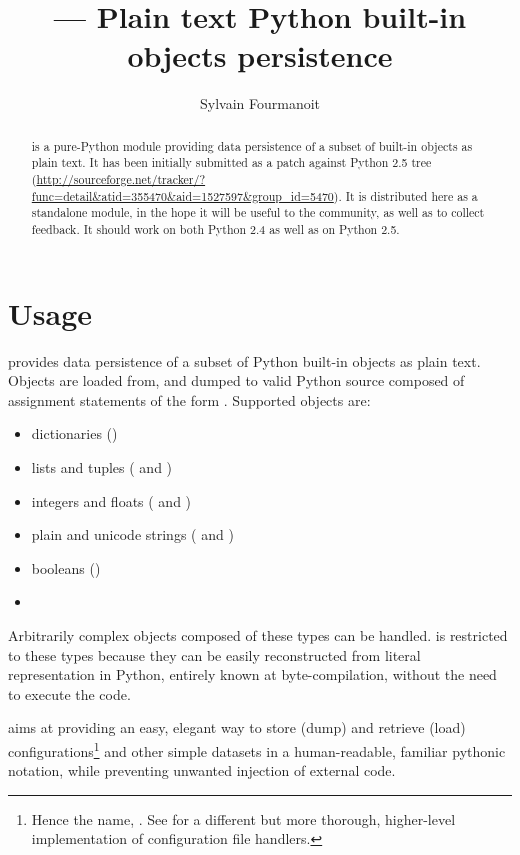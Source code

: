 \documentclass{howto}
\title{\module{miniconf} --- Plain text Python built-in objects persistence}
\author{Sylvain Fourmanoit}
\begin{document}
\maketitle

\begin{abstract}
\noindent
{} is a pure-Python module providing data persistence of a subset
of built-in objects as plain text. It has been initially submitted as a patch
against Python 2.5 tree
(\url{http://sourceforge.net/tracker/?func=detail\&atid=355470\&aid=1527597\&group_id=5470}).
It is distributed here as a standalone module, in the hope it will be useful to
the community, as well as to collect feedback. It should work on both Python 2.4
as well as on Python 2.5.
\end{abstract}

\tableofcontents

\section{Usage}
 provides data persistence of a subset of Python built-in
objects as plain text. Objects are loaded from, and dumped to valid Python
source composed of assignment statements of the form
. Supported objects are:

\begin{itemize}
\item dictionaries ()
\item lists and tuples ( and )
\item integers and floats ( and )
\item plain and unicode strings ( and )
\item booleans ()
\item {}
\end{itemize}

Arbitrarily complex objects composed of these types can be
handled.  is restricted to these types because they can be
easily reconstructed from literal representation in Python, entirely known at
byte-compilation, without the need to execute the code.

 aims at providing an easy, elegant way to store (dump) and
retrieve (load) configurations\footnote{Hence the name, . See
 for a different but more thorough, higher-level
implementation of configuration file handlers.} and other simple datasets in a
human-readable, familiar pythonic notation, while preventing unwanted injection
of external code.
\end{document}
